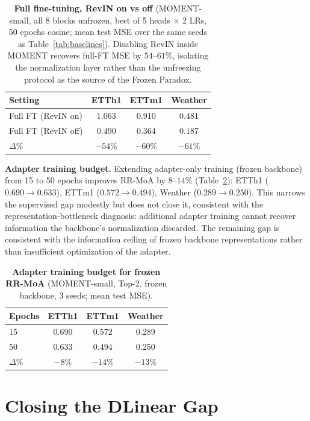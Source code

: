 \documentclass{article}
\begin{document}
\begin{table}[!htbp]
\centering
\caption{\textbf{Full fine-tuning, RevIN on vs off} (MOMENT-small, all 8 blocks unfrozen, best of 5 heads $\times$ 2 LRs, 50 epochs cosine; mean test MSE over the same seeds as Table~\ref{tab:baselines}). Disabling RevIN inside MOMENT recovers full-FT MSE by $54$--$61\%$, isolating the normalization layer rather than the unfreezing protocol as the source of the Frozen Paradox.}
\label{tab:fullft_revin}
\small
\begin{tabular}{@{}lccc@{}}
\toprule
Setting & ETTh1 & ETTm1 & Weather \\
\midrule
Full FT (RevIN on)  & $1.063$ & $0.910$ & $0.481$ \\
Full FT (RevIN off) & $\mathbf{0.490}$ & $\mathbf{0.364}$ & $\mathbf{0.187}$ \\
$\Delta$\%          & $-54\%$ & $-60\%$ & $-61\%$ \\
\bottomrule
\end{tabular}
\end{table}

\textbf{Adapter training budget.} Extending adapter-only training (frozen backbone) from 15 to 50 epochs improves RR-MoA by $8$--$14\%$ (Table~\ref{tab:rrmoa_budget}): ETTh1 ($0.690 \to 0.633$), ETTm1 ($0.572 \to 0.494$), Weather ($0.289 \to 0.250$). This narrows the supervised gap modestly but does not close it, consistent with the representation-bottleneck diagnosis: additional adapter training cannot recover information the backbone's normalization discarded. The remaining gap is consistent with the information ceiling of frozen backbone representations rather than insufficient optimization of the adapter.

\begin{table}[!htbp]
\centering
\caption{\textbf{Adapter training budget for frozen RR-MoA} (MOMENT-small, Top-2, frozen backbone, 3 seeds; mean test MSE).}
\label{tab:rrmoa_budget}
\small
\begin{tabular}{@{}lccc@{}}
\toprule
Epochs & ETTh1 & ETTm1 & Weather \\
\midrule
15 & $0.690$ & $0.572$ & $0.289$ \\
50 & $\mathbf{0.633}$ & $\mathbf{0.494}$ & $\mathbf{0.250}$ \\
$\Delta$\% & $-8\%$ & $-14\%$ & $-13\%$ \\
\bottomrule
\end{tabular}
\end{table}

\section{Closing the DLinear Gap}
\label{app:gap_closing}
\end{document}
